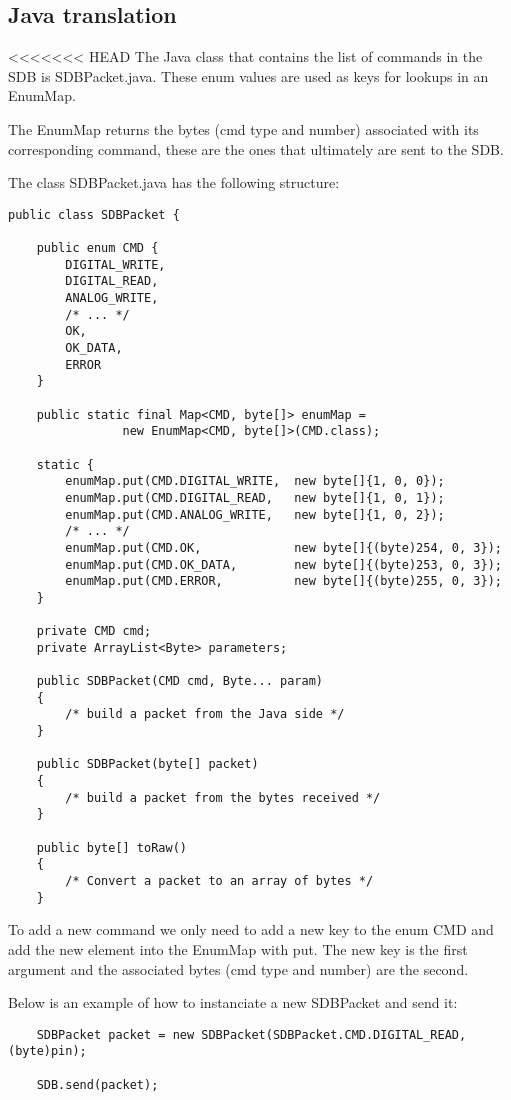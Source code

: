\documentclass[12pt,a4paper]{report}
\begin{document}
\subsection*{Java translation}
<<<<<<< HEAD
The Java class that contains the list of commands in the SDB is SDBPacket.java. These enum values are used as keys for lookups in an EnumMap.

The EnumMap returns the bytes (cmd type and number) associated with its corresponding command, these are the ones that ultimately are sent to the SDB.

The class SDBPacket.java has the following structure:

\begin{lstlisting}
public class SDBPacket {

    public enum CMD {
        DIGITAL_WRITE,
        DIGITAL_READ,
        ANALOG_WRITE,
        /* ... */
        OK,
        OK_DATA,
        ERROR
    }
    
    public static final Map<CMD, byte[]> enumMap =
                new EnumMap<CMD, byte[]>(CMD.class);
    
    static {
        enumMap.put(CMD.DIGITAL_WRITE,  new byte[]{1, 0, 0});
        enumMap.put(CMD.DIGITAL_READ,   new byte[]{1, 0, 1});
        enumMap.put(CMD.ANALOG_WRITE,   new byte[]{1, 0, 2});
        /* ... */
        enumMap.put(CMD.OK,             new byte[]{(byte)254, 0, 3});
        enumMap.put(CMD.OK_DATA,        new byte[]{(byte)253, 0, 3});
        enumMap.put(CMD.ERROR,          new byte[]{(byte)255, 0, 3});
    }

    private CMD cmd;
    private ArrayList<Byte> parameters;
    
    public SDBPacket(CMD cmd, Byte... param)
    {
        /* build a packet from the Java side */
    }
    
    public SDBPacket(byte[] packet)
    {
        /* build a packet from the bytes received */  
    }
    
    public byte[] toRaw()
    {
        /* Convert a packet to an array of bytes */
    }
\end{lstlisting}

To add a new command we only need to add a new key to the enum CMD and add the new element into the EnumMap with put. The new key is the first argument and the associated bytes (cmd type and number) are the second.

Below is an example of how to instanciate a new SDBPacket and send it:

\begin{lstlisting}
    SDBPacket packet = new SDBPacket(SDBPacket.CMD.DIGITAL_READ,(byte)pin);
    
    SDB.send(packet);
\end{lstlisting}
\end{document}
